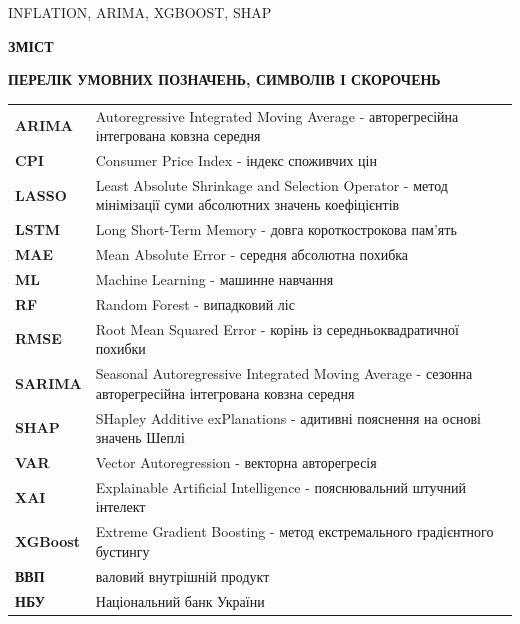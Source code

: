 \documentclass[a4paper,ukrainian,oneside]{extreport}
\makeatletter
\newcommand{\setfontsize}[1]{\fontsize{#1pt}{#1pt}\selectfont}
\renewcommand{\tableofcontents}{
    \clearpage
    \thispagestyle{empty}
    \begin{center}
        \bfseries\MakeUppercase{Зміст}
    \end{center}
    \addvspace{42pt}
    \@starttoc{toc}
}
\makeatother
\begin{document}
\vspace{6pt}
\MakeUppercase{INFLATION, ARIMA, XGBOOST, SHAP}

\clearpage

\tableofcontents

\newpage
\thispagestyle{plain}
\setfontsize{14}

\begin{center}
    {\bfseries\Large\MakeUppercase{Перелік умовних позначень, символів і скорочень}}
\end{center}

\vspace{12pt}

{\setfontsize{14}
\noindent\begin{tabularx}{\textwidth}{@{}>{\bfseries}p{2.5cm}@{\hspace{0.5cm}}X@{}}
ARIMA    & Autoregressive Integrated Moving Average - авторегресійна інтегрована ковзна середня \\
CPI      & Consumer Price Index - індекс споживчих цін \\
LASSO    & Least Absolute Shrinkage and Selection Operator - метод мінімізації суми абсолютних значень коефіцієнтів \\
LSTM     & Long Short-Term Memory - довга короткострокова пам'ять \\
MAE      & Mean Absolute Error - середня абсолютна похибка \\
ML       & Machine Learning - машинне навчання \\
RF       & Random Forest - випадковий ліс \\
RMSE     & Root Mean Squared Error - корінь із середньоквадратичної похибки \\
SARIMA   & Seasonal Autoregressive Integrated Moving Average - сезонна авторегресійна інтегрована ковзна середня \\
SHAP     & SHapley Additive exPlanations - адитивні пояснення на основі значень Шеплі \\
VAR      & Vector Autoregression - векторна авторегресія \\
XAI      & Explainable Artificial Intelligence - пояснювальний штучний інтелект \\
XGBoost  & Extreme Gradient Boosting - метод екстремального градієнтного бустингу \\
ВВП      & валовий внутрішній продукт \\
НБУ      & Національний банк України \\
\end{tabularx}
\par}
\end{document}
